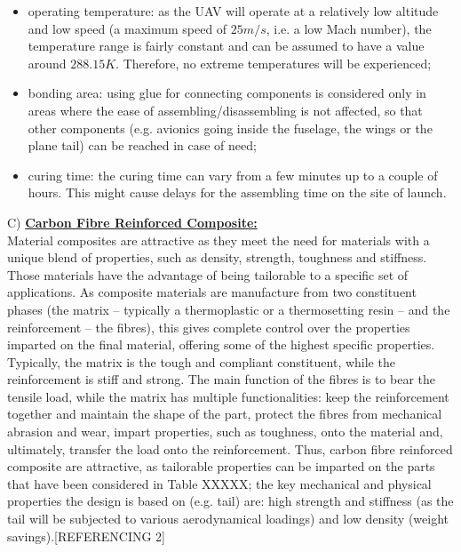 \documentclass[12pt]{article}
\begin{document}
\begin{itemize}
\item operating temperature: as the UAV will operate at a relatively low altitude and low speed (a maximum speed of $25m/s$, i.e. a low Mach number), the temperature range is fairly constant and can be assumed to have a value around $288.15K$. Therefore, no extreme temperatures will be experienced;
\item bonding area: using glue for connecting components is considered only in areas where the ease of assembling/disassembling is not affected, so that other components (e.g. avionics going inside the fuselage, the wings or the plane tail) can be reached in case of need;
\item curing time: the curing time can vary from a few minutes up to a couple of hours. This might cause delays for the assembling time on the site of launch.
\end{itemize}

C) \textbf{\underline{Carbon Fibre Reinforced Composite: }}\\

\noindent Material composites are attractive as they meet the need for materials with a unique blend of properties, such as density, strength, toughness and stiffness. Those materials have the advantage of being tailorable to a specific set of applications. As composite materials are manufacture from two constituent phases (the matrix – typically a thermoplastic or a thermosetting resin – and the reinforcement – the fibres), this gives complete control over the properties imparted on the final material, offering some of the highest specific properties. Typically, the matrix is the tough and compliant constituent, while the reinforcement is stiff and strong. The main function of the fibres is to bear the tensile load, while the matrix has multiple functionalities: keep the reinforcement together and maintain the shape of the part, protect the fibres from mechanical abrasion and wear, impart properties, such as toughness, onto the material and, ultimately, transfer the load onto the reinforcement. Thus, carbon fibre reinforced composite are attractive, as tailorable properties can be imparted on the parts that have been considered in Table XXXXX; the key mechanical and physical properties the design is based on (e.g. tail) are: high strength and stiffness (as the tail will be subjected to various aerodynamical loadings) and low density (weight savings).[REFERENCING 2] \\
\end{document}

